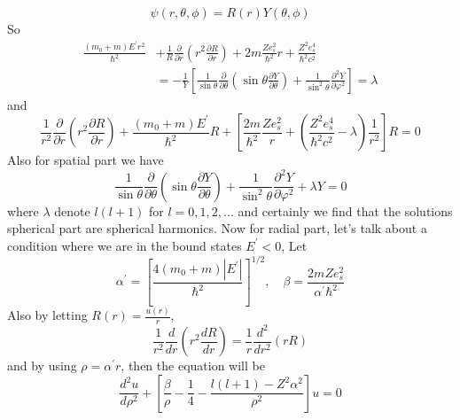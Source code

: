 \documentclass{article}
\begin{document}
\begin{equation}
	\psi(r, \theta, \phi) = R(r) Y(\theta, \phi)
\end{equation}
So
\begin{equation}
\begin{aligned}
\frac{\left(m_{0}+m\right) E^{\prime} r^{2}}{\hbar^{2}} &+\frac{1}{R} \frac{\partial}{\partial r}\left(r^{2} \frac{\partial R}{\partial r}\right)+2 m \frac{Z e_{s}^{2}}{\hbar^{2}} r+\frac{Z^{2} e_{s}^{4}}{\hbar^{2} c^{2}} \\
&=-\frac{1}{Y}\left[\frac{1}{\sin \theta} \frac{\partial}{\partial \theta}\left(\sin \theta \frac{\partial Y}{\partial \theta}\right)+\frac{1}{\sin ^{2} \theta} \frac{\partial^{2} Y}{\partial \varphi^{2}}\right]=\lambda
\end{aligned}
\end{equation}
and 
\begin{equation}
\frac{1}{r^{2}} \frac{\partial}{\partial r}\left(r^{2} \frac{\partial R}{\partial r}\right)+\frac{\left(m_{0}+m\right) E^{\prime}}{\hbar^{2}} R+\left[\frac{2 m}{\hbar^{2}} \frac{Z e_{s}^{2}}{r}+\left(\frac{Z^{2} e_{s}^{4}}{\hbar^{2} c^{2}}-\lambda\right) \frac{1}{r^{2}}\right] R=0
\end{equation}
Also for spatial part we have 
\begin{equation}
\frac{1}{\sin \theta} \frac{\partial}{\partial \theta}\left(\sin \theta \frac{\partial Y}{\partial \theta}\right)+\frac{1}{\sin ^{2} \theta} \frac{\partial^{2} Y}{\partial \varphi^{2}}+\lambda Y=0
\end{equation}
where \(\lambda\) denote \(l(l+1)\) for \(l=0, 1, 2, ...\) and certainly we find that the solutions spherical part are spherical harmonics. Now for radial part, let's talk about a condition where we are in the bound states \(E^{\prime}<0\), Let
\begin{equation}
\alpha^{\prime}=\left[\frac{4\left(m_{0}+m\right)\left|E^{\prime}\right|}{\hbar^{2}}\right]^{1 / 2}, \quad \beta=\frac{2 m Z e_{s}^{2}}{\alpha^{\prime} \hbar^{2}}
\end{equation}
Also by letting \(R(r)=\frac{u(r)}{r}\),
\begin{equation}
\frac{1}{r^{2}} \frac{d}{d r}\left(r^{2} \frac{d R}{d r}\right)=\frac{1}{r} \frac{d^{2}}{d r^{2}}(r R)
\end{equation}
and by using \(\rho = \alpha^{\prime} r\), then the equation will be
\begin{equation}
\frac{d^{2} u}{d \rho^{2}}+\left[\frac{\beta}{\rho}-\frac{1}{4}-\frac{l(l+1)-Z^{2} \alpha^{2}}{\rho^{2}}\right] u=0
\end{equation}
\end{document}
